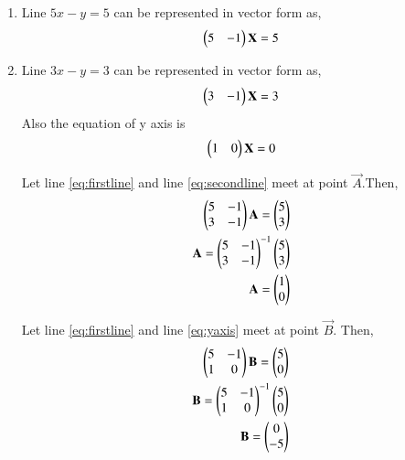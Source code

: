 \renewcommand{\theequation}{\theenumi}
\begin{enumerate}[label=\thesection.\arabic*.,ref=\thesection.\theenumi]

\item Line $5x-y=5$ can be represented in vector form as,
\begin{align}
\label{eq:firstline}
\begin{pmatrix}5&-1\end{pmatrix}\mathbf{X}=5
\end{align}

\item Line $3x-y=3$ can be represented in vector form as,
\begin{align}
\label{eq:secondline}
\begin{pmatrix}3&-1\end{pmatrix}\mathbf{X}=3
\end{align}
%
Also the equation of y axis is 
\begin{align}
\begin{pmatrix}1&0\end{pmatrix}\mathbf{X}=0
\label{eq:yaxis}
\end{align}

Let line \ref{eq:firstline} and  line \ref{eq:secondline} meet at point $\vec{A}$.Then, 
\begin{align}
\begin{pmatrix}5&-1\\3&-1\end{pmatrix}\mathbf{A} =\begin{pmatrix}5\\3\end{pmatrix}
\\
\mathbf{A}={\begin{pmatrix}5&-1\\3&-1\end{pmatrix}}^{-1}\begin{pmatrix}5\\3\end{pmatrix}
\\
\mathbf{A}=\begin{pmatrix}1\\0\end{pmatrix}
\end{align}

Let line \ref{eq:firstline} and  line \ref{eq:yaxis} meet at point $\vec{B}$. Then, 
\begin{align}
\begin{pmatrix}5&-1\\1&0\end{pmatrix}\mathbf{B} =\begin{pmatrix}5\\0\end{pmatrix}
\\
\mathbf{B}={\begin{pmatrix}5&-1\\1&0\end{pmatrix}}^{-1}\begin{pmatrix}5\\0\end{pmatrix}
\\
\mathbf{B}=\begin{pmatrix}0\\-5\end{pmatrix}
\end{align}


\end{enumerate}
